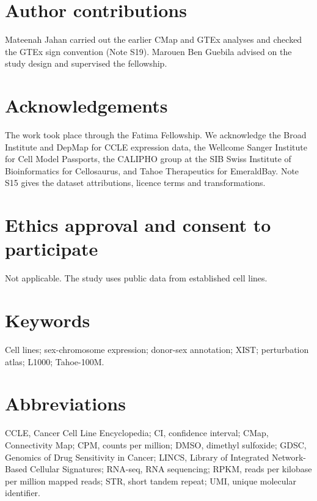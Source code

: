 \documentclass[
  11pt,
  letterpaper,
]{article}
\begin{document}
\section*{Author contributions}\label{author-contributions}

Mateenah Jahan carried out the earlier CMap and GTEx analyses and
checked the GTEx sign convention (Note S19). Marouen Ben Guebila advised
on the study design and supervised the fellowship.

\section*{Acknowledgements}\label{acknowledgements}

The work took place through the Fatima Fellowship. We acknowledge the
Broad Institute and DepMap for CCLE expression data, the Wellcome Sanger
Institute for Cell Model Passports, the CALIPHO group at the SIB Swiss
Institute of Bioinformatics for Cellosaurus, and Tahoe Therapeutics for
EmeraldBay. Note S15 gives the dataset attributions, licence terms and
transformations.

\section*{Ethics approval and consent to
participate}\label{ethics-approval-and-consent-to-participate}

Not applicable. The study uses public data from established cell lines.

\section*{Keywords}\label{keywords}

Cell lines; sex-chromosome expression; donor-sex annotation; XIST;
perturbation atlas; L1000; Tahoe-100M.

\section*{Abbreviations}\label{abbreviations}

CCLE, Cancer Cell Line Encyclopedia; CI, confidence interval; CMap,
Connectivity Map; CPM, counts per million; DMSO, dimethyl sulfoxide;
GDSC, Genomics of Drug Sensitivity in Cancer; LINCS, Library of
Integrated Network-Based Cellular Signatures; RNA-seq, RNA sequencing;
RPKM, reads per kilobase per million mapped reads; STR, short tandem
repeat; UMI, unique molecular identifier.
\end{document}
